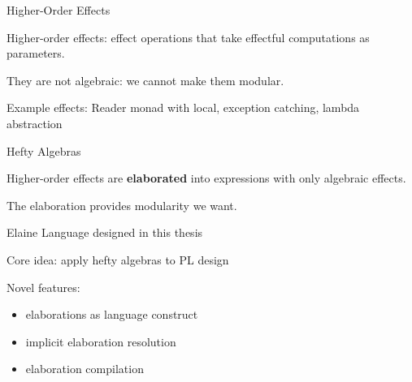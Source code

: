 \documentclass{beamer}
\begin{document}
\begin{frame}{Higher-Order Effects}

Higher-order effects: effect operations that take effectful computations as parameters.

They are not algebraic: we cannot make them modular.

Example effects: Reader monad with local, exception catching, lambda abstraction

\end{frame}

\begin{frame}{Hefty Algebras}

Higher-order effects are \textbf{elaborated} into expressions with only algebraic effects.

The elaboration provides modularity we want.

\end{frame}

\begin{frame}{Elaine}
Language designed in this thesis

Core idea: apply hefty algebras to PL design

\vspace{2em}

Novel features:

\begin{itemize}
    \item elaborations as language construct
    \item implicit elaboration resolution
    \item elaboration compilation
\end{itemize}
\end{frame}
\end{document}
